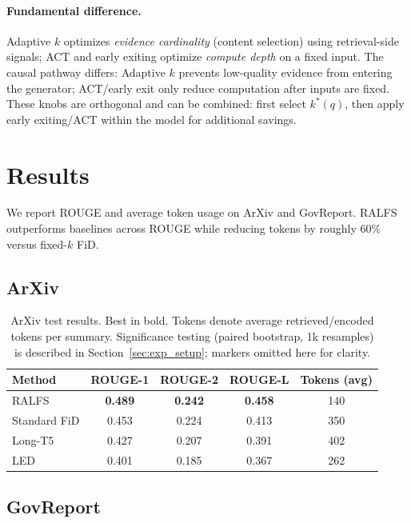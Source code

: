 \documentclass[11pt,a4paper]{article}
\begin{document}
\paragraph{Fundamental difference.}
Adaptive $k$ optimizes \emph{evidence cardinality} (content selection) using retrieval-side signals; ACT and early exiting optimize \emph{compute depth} on a fixed input. The causal pathway differs: Adaptive $k$ prevents low-quality evidence from entering the generator; ACT/early exit only reduce computation after inputs are fixed. These knobs are orthogonal and can be combined: first select $k^*(q)$, then apply early exiting/ACT within the model for additional savings.

\section{Results}
\label{sec:results}

We report ROUGE and average token usage on ArXiv and GovReport. RALFS outperforms baselines across ROUGE while reducing tokens by roughly 60\% versus fixed-$k$ FiD.

\subsection{ArXiv}

\begin{table}[H]
\centering
\small
\setlength{\tabcolsep}{8pt}
\begin{tabular}{lcccc}
\toprule
\textbf{Method} & \textbf{ROUGE-1} & \textbf{ROUGE-2} & \textbf{ROUGE-L} & \textbf{Tokens (avg)} \\
\midrule
RALFS & \textbf{0.489} & \textbf{0.242} & \textbf{0.458} & 140 \\
Standard FiD & 0.453 & 0.224 & 0.413 & 350 \\
Long-T5 & 0.427 & 0.207 & 0.391 & 402 \\
LED & 0.401 & 0.185 & 0.367 & 262 \\
\bottomrule
\end{tabular}
\caption{ArXiv test results. Best in bold. Tokens denote average retrieved/encoded tokens per summary. Significance testing (paired bootstrap, 1k resamples) is described in Section~\ref{sec:exp_setup}; markers omitted here for clarity.}
\label{tab:results_arxiv}
\end{table}

\subsection{GovReport}
\end{document}
